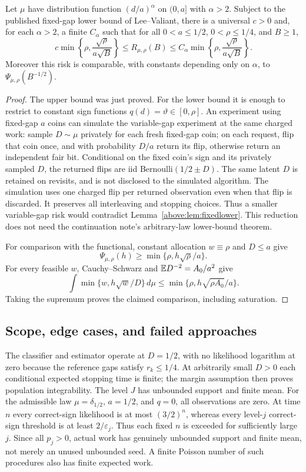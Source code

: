 \begin{corollary}\label{above:cor:power}
Let $\mu$ have distribution function $(d/a)^\alpha$ on $(0,a]$ with $\alpha>2$.
Subject to the published fixed-gap lower bound of Lee--Valiant, there is a
universal $c>0$ and, for each $\alpha>2$, a finite $C_\alpha$ such that for all
$0<a\le1/2$, $0<\rho\le1/4$, and $B\ge1$,
\[
 c\min\left\{\rho,\frac{\sqrt\rho}{a\sqrt B}\right\}
 \le R_{\mu,\rho}(B)
 \le C_\alpha\min\left\{\rho,\frac{\sqrt\rho}{a\sqrt B}\right\}.
\]
Moreover this risk is comparable, with constants depending only on $\alpha$,
to $\Psi_{\mu,\rho}(B^{-1/2})$.
\end{corollary}
\begin{proof}
The upper bound was just proved. For the lower bound it is enough to restrict
to constant sign functions $q(d)=\vartheta\in[0,\rho]$. An experiment using
fixed-gap $a$ coins can simulate the variable-gap experiment at the same charged
work: sample $D\sim\mu$ privately for each fresh fixed-gap coin; on each request,
flip that coin once, and with probability $D/a$ return its flip, otherwise
return an independent fair bit. Conditional on the fixed coin's sign and its
privately sampled $D$, the
returned flips are iid Bernoulli$(1/2\pm D)$. The same latent $D$ is retained
on revisits, and is not disclosed to the simulated algorithm. The simulation
uses one charged flip per returned observation even when that flip is discarded.
It preserves all interleaving and stopping choices. Thus a smaller variable-gap
risk would contradict Lemma~\ref{above:lem:fixedlower}. This reduction does not need
the continuation note's arbitrary-law lower-bound theorem.

For comparison with the functional, constant allocation $w\equiv\rho$ and
$D\le a$ give
\[
 \Psi_{\mu,\rho}(h)\ge\min\{\rho,h\sqrt\rho/a\}.
\]
For every feasible $w$, Cauchy--Schwarz and $\mathbb E D^{-2}=A_0/a^2$ give
\[
 \int\min\{w,h\sqrt w/D\}\,d\mu
 \le\min\{\rho,h\sqrt{\rho A_0}/a\}.
\]
Taking the supremum proves the claimed comparison, including saturation.
\end{proof}

\subsection{Scope, edge cases, and failed approaches}
The classifier and estimator operate at $D=1/2$, with no likelihood logarithm
at zero because the reference gaps satisfy $r_k\le1/4$. At arbitrarily small
$D>0$ each conditional expected stopping time is finite; the margin assumption
then proves population integrability. The level $J$ has unbounded support and
finite mean. For the admissible law $\mu=\delta_{1/2}$, $a=1/2$, and $q=0$,
all observations are zero. At time $n$ every correct-sign likelihood is at most
$(3/2)^n$, whereas every level-$j$ correct-sign threshold is at least
$2/\varepsilon_j$. Thus each fixed $n$ is exceeded for sufficiently large $j$.
Since all $p_j>0$, actual work has genuinely unbounded support and finite mean,
not merely an unused unbounded seed. A finite Poisson number of such procedures
also has finite expected work.

